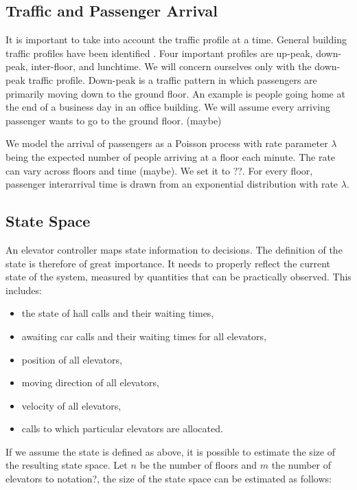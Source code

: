 \subsection{Traffic and Passenger Arrival}

It is important to take into account the traffic profile at a time. General building traffic profiles have been identified \cite{elevator_dynamics}. Four important profiles are up-peak, down-peak, inter-floor, and lunchtime. We will concern ourselves only with the down-peak traffic profile. Down-peak is a traffic pattern in which passengers are primarily moving down to the ground floor. An example is people going home at the end of a business day in an office building. {\color{red} We will assume every arriving passenger wants to go to the ground floor. (maybe)}

We model the arrival of passengers as a Poisson process with rate parameter $\lambda$ being the expected number of people arriving at a floor each minute. The rate can vary across floors {\color{red} and time (maybe)}. We set it to ??. For every floor, passenger interarrival time is  drawn from an exponential distribution with rate $\lambda$.

\subsection{State Space}

An elevator controller maps state information to decisions. The definition of the state is therefore of great importance. It needs to properly reflect the current state of the system, measured by quantities that can be practically observed. This includes:

\begin{itemize}
    \item the state of hall calls and their waiting times,
    \item awaiting car calls and their waiting times for all elevators,
    \item position of all elevators,
    \item moving direction of all elevators,
    \item velocity of all elevators,
    \item calls to which particular elevators are allocated.
\end{itemize}

If we assume the state is defined as above, it is possible to estimate the size of the resulting state space. Let $n$ be the number of floors and $m$ the number of elevators {\color{red} to notation?}, the size of the state space can be estimated as follows:

